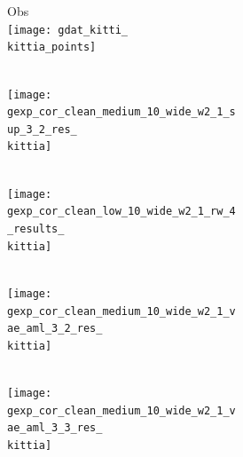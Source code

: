\newcommand{\kittia}{0}
\newcommand{\kittib}{612}
\newcommand{\kittic}{1224}
\newcommand{\kittid}{2754}
\newcommand{\kittie}{3060}
\newcommand{\kittif}{5508} %
\begin{figure}[t]
    \vspace*{-\figskipabove px}
    \vspace*{2px}
	\centering
	{\scriptsize 

    \begin{subfigure}[t]{0.5\textwidth}
        \vspace{0px}\centering
		\begin{subfigure}[t]{0.15\textwidth}
			\vspace{0px}\centering
			Obs\\
			\texttt{[image: gdat\_kitti\_\\kittia\_points]}
		\end{subfigure}
		\begin{subfigure}[t]{0.15\textwidth}
			\vspace{0px}\centering
			\Dai\\
			\texttt{[image: gexp\_cor\_clean\_medium\_10\_wide\_w2\_1\_sup\_3\_2\_res\_\\kittia]}
		\end{subfigure}
		\begin{subfigure}[t]{0.15\textwidth}
			\vspace{0px}\centering
			\Engelmann\\
			\texttt{[image: gexp\_cor\_clean\_low\_10\_wide\_w2\_1\_rw\_4\_results\_\\kittia]}
		\end{subfigure}
		\begin{subfigure}[t]{0.15\textwidth}
			\vspace{0px}\centering
			\AML\\
			\texttt{[image: gexp\_cor\_clean\_medium\_10\_wide\_w2\_1\_vae\_aml\_3\_2\_res\_\\kittia]}
		\end{subfigure}
		\begin{subfigure}[t]{0.15\textwidth}
			\vspace{0px}\centering
			\AML\\
			\texttt{[image: gexp\_cor\_clean\_medium\_10\_wide\_w2\_1\_vae\_aml\_3\_3\_res\_\\kittia]}
		\end{subfigure}
		\begin{subfigure}[t]{0.15\textwidth}
			\vspace{0px}\centering

\end{subfigure}
\end{subfigure}}
\end{figure}
